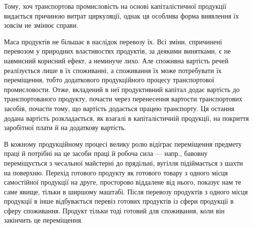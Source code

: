 Тому, хоч транспортова промисловість на основі капіталістичної продукції
видається причиною витрат циркуляції, однак ця особлива форма
виявлення їх зовсім не змінює справи.

Маса продуктів не більшає в наслідок перевозу їх. Всі зміни, спричинені
перевозом у природних властивостях продуктів, за деякими винятками,
є не навмисний корисний ефект, а неминуче лихо. Але споживна вартість
речей реалізується лише в їх споживанні, а споживання їх може потребувати
їх переміщення, тобто додаткового продукційного процесу
транспортової промисловости. Отже, вкладений в неї продуктивний капітал
додає вартість до транспортованого продукту, почасти через перенесення
вартости транспортових засобів, почасти тому, що вартість додається працею
транспорту. Ця остання додана вартість розкладається, як взагалі в
капіталістичній продукції, на покриття заробітної плати й на додаткову
вартість.

В кожному продукційному процесі велику ролю відіграє переміщення
предмету праці й потрібні на це засоби праці й робоча сила — напр.,
бавовну переміщується з чесальної майстерні до прядільні, вугілля підіймається
з шахти на поверхню. Перехід готового продукту як готового
товару з одного місця самостійної продукції на друге, просторово віддалене
від нього, показує нам те саме явище, тільки в ширшому маштабі.
Після перевозу продуктів з одного місця продукції в інше відбувається
перевіз готових продуктів із сфери продукції в сферу споживання.
Продукт тільки тоді готовий для споживання, коли він закінчить це
переміщення.

